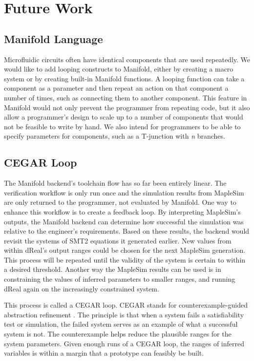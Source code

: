 \section{Future Work}

\subsection{Manifold Language}

Microfluidic circuits often have identical components that are used repeatedly.
We would like to add looping constructs to Manifold, either by creating a
macro system or by creating built-in Manifold functions. A looping function
can take a component as a parameter and then repeat an action on that
component a number of times, such as connecting them to another component.
This feature in Manifold would not only prevent the programmer from repeating
code, but it also allow a programmer's design to scale up to a number of
components that would not be feasible to write by hand. We also intend for
programmers to be able to specify parameters for components, such as a T-junction with \emph{n} branches.

\subsection{CEGAR Loop}

The Manifold backend's toolchain flow has so far been entirely linear.
The verification workflow is only run once and the simulation results from MapleSim are only returned
to the programmer, not evaluated by Manifold. One way to enhance this workflow is to create a feedback
loop.
By interpreting MapleSim's outputs, the Manifold backend can determine how successful the simulation was
relative to the engineer's requirements.
Based on these results, the backend would revisit the systems of SMT2 equations it generated earlier.
New values from within dReal's output ranges could be chosen for the next MapleSim generation.
This process will be repeated until the validity of the system is certain to within a desired threshold.
Another way the MapleSim results can be used is in constraining the values of inferred parameters to
smaller ranges, and running dReal again on the increasingly constrained system.

This process is called a CEGAR loop. CEGAR stands for counterexample-guided abstraction refinement \cite
{cegar}.
The principle is that when a system fails a satisfiability test or simulation, the failed system
serves as an example of what a successful system is not.
The counterexample helps reduce the plausible ranges for the system parameters.
Given enough runs of a CEGAR loop, the ranges of inferred variables is within a margin that a prototype
can feasibly be built.

